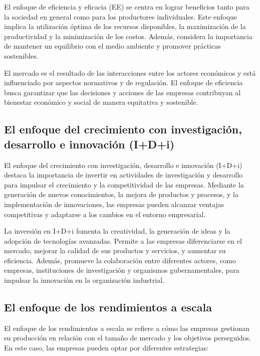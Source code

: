\documentclass[
  a4paper,
]{article}
\begin{document}
El enfoque de eficiencia y eficacia (EE) se centra en lograr beneficios
tanto para la sociedad en general como para los productores
individuales. Este enfoque implica la utilización óptima de los recursos
disponibles, la maximización de la productividad y la minimización de
los costos. Además, considera la importancia de mantener un equilibrio
con el medio ambiente y promover prácticas sostenibles.

El mercado es el resultado de las interacciones entre los actores
económicos y está influenciado por aspectos normativos y de regulación.
El enfoque de eficiencia busca garantizar que las decisiones y acciones
de las empresas contribuyan al bienestar económico y social de manera
equitativa y sostenible.

\hypertarget{el-enfoque-del-crecimiento-con-investigaciuxf3n-desarrollo-e-innovaciuxf3n-idi}{%
\subsection{El enfoque del crecimiento con investigación, desarrollo e
innovación
(I+D+i)}\label{el-enfoque-del-crecimiento-con-investigaciuxf3n-desarrollo-e-innovaciuxf3n-idi}}

El enfoque del crecimiento con investigación, desarrollo e innovación
(I+D+i) destaca la importancia de invertir en actividades de
investigación y desarrollo para impulsar el crecimiento y la
competitividad de las empresas. Mediante la generación de nuevos
conocimientos, la mejora de productos y procesos, y la implementación de
innovaciones, las empresas pueden alcanzar ventajas competitivas y
adaptarse a los cambios en el entorno empresarial.

La inversión en I+D+i fomenta la creatividad, la generación de ideas y
la adopción de tecnologías avanzadas. Permite a las empresas
diferenciarse en el mercado, mejorar la calidad de sus productos y
servicios, y aumentar su eficiencia. Además, promueve la colaboración
entre diferentes actores, como empresas, instituciones de investigación
y organismos gubernamentales, para impulsar la innovación en la
organización industrial.

\hypertarget{el-enfoque-de-los-rendimientos-a-escala}{%
\subsection{El enfoque de los rendimientos a
escala}\label{el-enfoque-de-los-rendimientos-a-escala}}

El enfoque de los rendimientos a escala se refiere a cómo las empresas
gestionan su producción en relación con el tamaño de mercado y los
objetivos perseguidos. En este caso, las empresas pueden optar por
diferentes estrategias:
\end{document}
